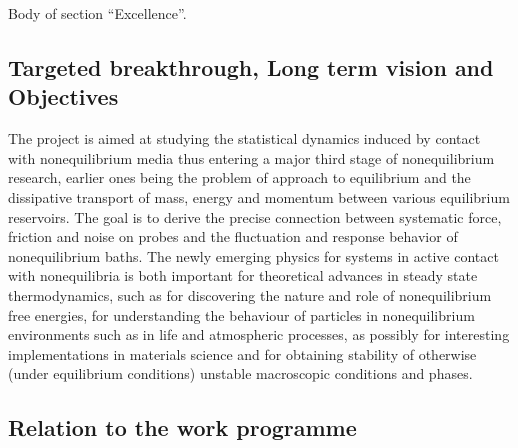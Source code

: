 
Body of section ``Excellence''.

\subsection{Targeted breakthrough, Long term vision and Objectives}\label{sec:objectives}


The project is aimed at studying the statistical dynamics induced by contact with nonequilibrium media thus entering a major third stage of nonequilibrium research, earlier ones being the problem of approach to equilibrium and the dissipative transport of mass, energy and momentum between various equilibrium reservoirs.  The goal is to derive the precise connection between systematic force, friction and noise on probes and the fluctuation and response behavior of nonequilibrium baths.  The newly emerging physics for systems in active contact with nonequilibria is both important for theoretical advances in steady state thermodynamics, such as for discovering the nature and role of nonequilibrium free energies, for understanding the behaviour of particles in nonequilibrium environments such as in life and atmospheric processes, as possibly for interesting implementations in materials science and for obtaining stability of otherwise (under equilibrium conditions) unstable macroscopic conditions and phases. 



\subsection{Relation to the work programme}\label{sec:relation-wp}


